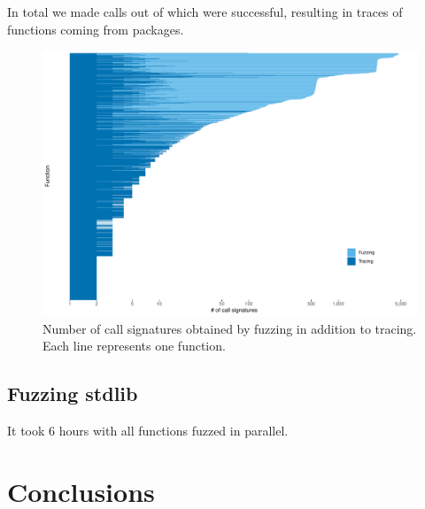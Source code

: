 \documentclass[sigplan,anonymous,review]{acmart}
\begin{document}
In total we made \UFNumTracesRnd calls out of which \UFRatioSuccessTraces were successful, resulting in \UFNumSuccessTraces traces of \UFNumSuccessFunctions functions coming from \UFNumSuccessPackages packages.




\begin{figure}
    \centering
    \includegraphics[width=\columnwidth]{code-and-figures/uf-call-signatures.pdf}
    \caption{
        Number of call signatures obtained by fuzzing in addition to tracing. Each line represents one function.
    }\label{fig:sxpdb-pipeline}
\end{figure}

\subsection{Fuzzing stdlib}

%
It took 6 hours with all functions fuzzed in parallel.



\section{Conclusions}
\label{sec:conclusions}



\end{document}
